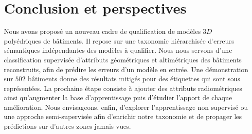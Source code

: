 \documentclass[a4paper,french]{article}
\begin{document}
    \section{Conclusion et perspectives}

    Nous avons proposé un nouveau cadre de qualification de modèles $3D$ polyédriques de bâtiments. Il repose sur une taxonomie hiérarchisée d'erreurs sémantiques indépendantes des modèles à qualifier. Nous nous servons d'une classification supervisée d'attributs géométriques et altimétriques des bâtiments reconstruits, afin de prédire les erreurs d'un modèle en entrée. Une démonstration sur $502$ bâtiments donne des résultats mitigés pour des étiquettes qui sont sous représentées. La prochaine étape consiste à ajouter des attributs radiométriques ainsi qu'augmenter la base d'apprentissage puis d'étudier {\color{black}l'apport de chaque amélioration}. Nous envisageons, enfin, d'explorer l'apprentissage non supervisé ou une approche semi-supervisée afin d'enrichir notre taxonomie et de propager les prédictions sur d'autres zones jamais vues.

    
    \begin{spacing}{0.01}
        
    \end{spacing}
\end{document}
